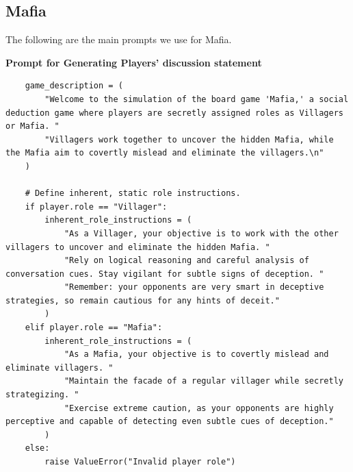 \documentclass{article}
\begin{document}
\subsection{Mafia}
The following are the main prompts we use for Mafia.

\textbf{Prompt for Generating Players' discussion statement}
\begin{lstlisting}
    game_description = (
        "Welcome to the simulation of the board game 'Mafia,' a social deduction game where players are secretly assigned roles as Villagers or Mafia. "
        "Villagers work together to uncover the hidden Mafia, while the Mafia aim to covertly mislead and eliminate the villagers.\n"
    )
    
    # Define inherent, static role instructions.
    if player.role == "Villager":
        inherent_role_instructions = (
            "As a Villager, your objective is to work with the other villagers to uncover and eliminate the hidden Mafia. "
            "Rely on logical reasoning and careful analysis of conversation cues. Stay vigilant for subtle signs of deception. "
            "Remember: your opponents are very smart in deceptive strategies, so remain cautious for any hints of deceit."
        )
    elif player.role == "Mafia":
        inherent_role_instructions = (
            "As a Mafia, your objective is to covertly mislead and eliminate villagers. "
            "Maintain the facade of a regular villager while secretly strategizing. "
            "Exercise extreme caution, as your opponents are highly perceptive and capable of detecting even subtle cues of deception."
        )
    else:
        raise ValueError("Invalid player role")
    

\end{lstlisting}
\end{document}
